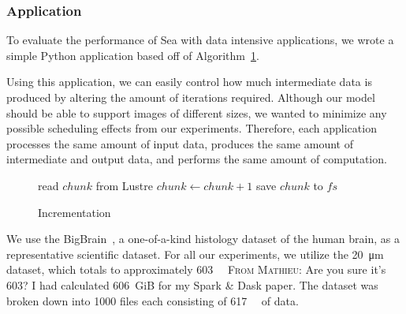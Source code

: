 \documentclass[10pt,journal,compsoc]{IEEEtran}
\makeatletter
\newcommand{\removelatexerror}{\let\@latex@error\@gobble}
\newcommand{\MD}[1]{\color{magenta}\textsc{From Mathieu}: #1\xspace\color{black}}
\makeatother
\begin{document}
\subsubsection{Application}


      To evaluate the performance of Sea with data intensive applications, we wrote a simple Python
      application based off of Algorithm~\ref{alg:sea-comp:incrementation}.
      
      Using this application, we can easily control how much intermediate data
      is produced by altering the amount of iterations required. Although our
      model should be able to support images of different sizes, we wanted to
      minimize any possible scheduling effects from our experiments. Therefore,
      each application processes the same amount of input data, produces the
      same amount of intermediate and output data, and performs the same amount
      of computation.
                                                                                   

      \begin{figure}[!t]
        \removelatexerror
        \begin{algorithm}[H]
          \caption{Incrementation}\label{alg:sea-comp:incrementation}
          \SetAlgoLined {}   { read $chunk$ from Lustre  { $chunk\gets chunk+1$ save $chunk$ to $fs$ } }
        \end{algorithm}
      \end{figure}

      We use the BigBrain~\cite{amunts2013bigbrain}, a one-of-a-kind histology
      dataset of the human brain, as a representative scientific dataset. For
      all our experiments, we utilize the \SI{20}{\micro\meter} dataset, which
      totals to approximately \SI{603}{\gibi\byte} \MD{Are you sure it's 603? I had calculated 606~GiB for my Spark \& Dask paper}. The dataset was broken down
      into 1000 files each consisting of \SI{617}{\mebi\byte} of data.
      
\end{document}

